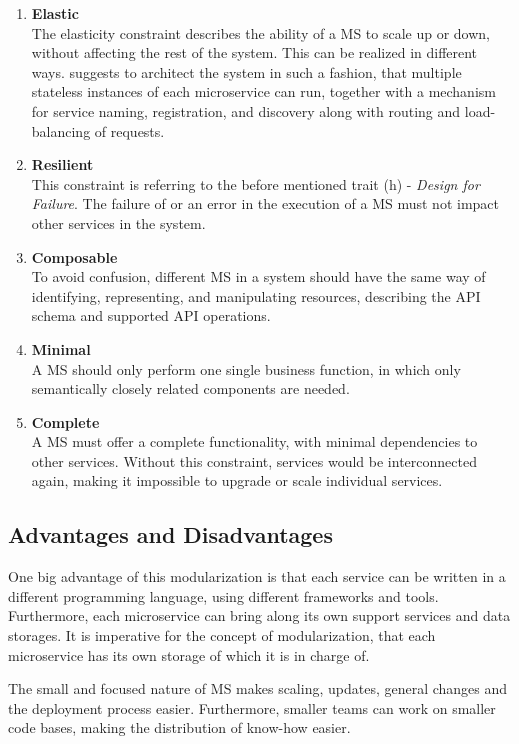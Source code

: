 \begin{enumerate}[(1.)]
	\item \textbf{Elastic}\\
	The elasticity constraint describes the ability of a MS to scale up or down, without affecting the rest of the system. This can be realized in different ways. \cite{Bugwadia15} suggests to architect the system in such a fashion, that multiple stateless instances of each microservice can run, together with a mechanism for service naming, registration, and discovery along with routing and load-balancing of requests.
	\item \textbf{Resilient}\\
	This constraint is referring to the before mentioned trait (h) - \emph{Design for Failure}. The failure of or an error in the execution of a MS must not impact other services in the system.
	\item \textbf{Composable}\\
	To avoid confusion, different MS in a system should have the same way of identifying, representing, and manipulating resources, describing the API schema and supported API operations.
	\item \textbf{Minimal}\\
	A MS should only perform one single business function, in which only semantically closely related components are needed.
	\item \textbf{Complete}\\
	A MS must offer a complete functionality, with minimal dependencies to other services. Without this constraint, services would be interconnected again, making it impossible to upgrade or scale individual services.
\end{enumerate}


\subsection{Advantages and Disadvantages}
One big advantage of this modularization is that each service can be written in a different programming language, using different frameworks and tools. Furthermore, each microservice can bring along its own support services and data storages. It is imperative for the concept of modularization, that each microservice has its own storage of which it is in charge of\cite{Wolff16}.

The small and focused nature of MS makes scaling, updates, general changes and the deployment process easier. Furthermore, smaller teams can work on smaller code bases, making the distribution of know-how easier\cite{Riggins15}.

